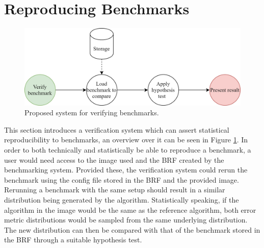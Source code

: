 \section{Reproducing Benchmarks}
\label{sec:reproduce_benchmarks}
\begin{figure}[h]
  \centering
  \includegraphics[width=\linewidth]{./img/verify_benchmark.png}
  \caption{Proposed system for verifying benchmarks.}
  \label{fig:proposed_validation_system}
\end{figure}
This section introduces a verification system which can assert statistical reproducibility to benchmarks, an overview over it can be seen in Figure \ref{fig:proposed_validation_system}.
In order to both technically and statistically be able to reproduce a benchmark, a user would need access to the image used and the BRF created by the benchmarking system. Provided these, the verification system could rerun the benchmark using the config file stored in the BRF and the provided image. Rerunning a benchmark with the same setup should result in a similar distribution being generated by the algorithm. Statistically speaking, if the algorithm in the image would be the same as the reference algorithm, both error metric distributions would be sampled from the same underlying distribution. The new distribution can then be compared with that of the benchmark stored in the BRF through a suitable hypothesis test.



